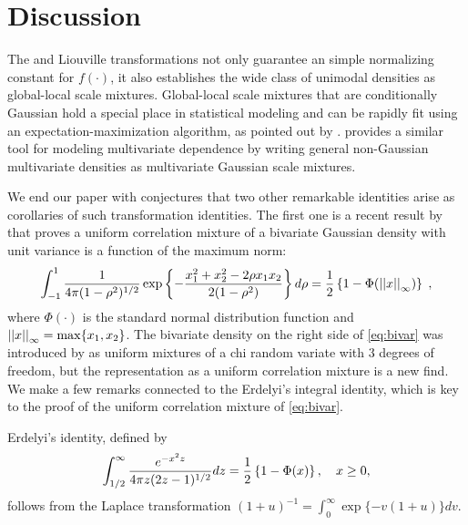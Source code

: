 \documentclass[lineno]{biometrika}
\begin{document}
\section{Discussion}
\label{sec:discussion}

The \CS{} and Liouville transformations not only guarantee an simple normalizing constant for $f(\cdot)$, it also establishes the wide class of unimodal densities as global-local scale mixtures. Global-local scale mixtures that are conditionally Gaussian hold a special place in statistical modeling and can be rapidly fit using an expectation-maximization algorithm, as
pointed out by \cite{polson_data_2013}. \cite{palmer_amica:_2011} provides a similar tool for modeling multivariate dependence by writing general non-Gaussian multivariate densities as multivariate Gaussian scale mixtures. %

We end our paper with conjectures that two other remarkable identities arise as corollaries of such transformation identities. The first one is a recent result by \cite{zhang2014uniform} that proves a uniform correlation mixture of a bivariate Gaussian density with unit variance is a function of the maximum norm: 
\begin{equation}
  \int_{-1}^{1} \frac{1}{4 \pi (1-\rho^2)^{1/2} } 
  \exp\left\{ - \frac{x_1^2 + x_2^2 - 2 \rho x_1 x_2}{2 (1-\rho^2)} \right\} d\rho = 
  \half \left\{1- \Phi(\vectornorm{x}_{\infty})\right\} 
  \;, 
  \label{eq:bivar}
\end{equation}
where $\Phi(\cdot)$ is the standard normal distribution function and $\left|\left|x\right|\right|_{\infty} = \max\{ x_1, x_2\}$. The bivariate density on the
right side of \eqref{eq:bivar} was introduced by \citet{bryson1982constructing} as uniform mixtures of a chi random variate with 3 degrees of freedom, but the representation as a uniform correlation mixture is a new find.  We make a few remarks connected to the Erdelyi's integral identity, which is key to the proof of the uniform correlation mixture of \eqref{eq:bivar}. 
\begin{lemma}
Erdelyi's identity, defined by
\begin{equation}
  \int_{1/2}^{\infty} \frac{e^{-x^2 z}}{4 \pi z 	(2z-1)^{1/2}} dz = \half \left\{1-\Phi(x)\right\}, \quad x \geq 0, \label{eq:erdelyi}
\end{equation}
follows from the Laplace transformation $(1+u)^{-1} = \int_0^{\infty} \exp\{-v(1+u)\} dv$. 
\end{lemma}
\end{document}
